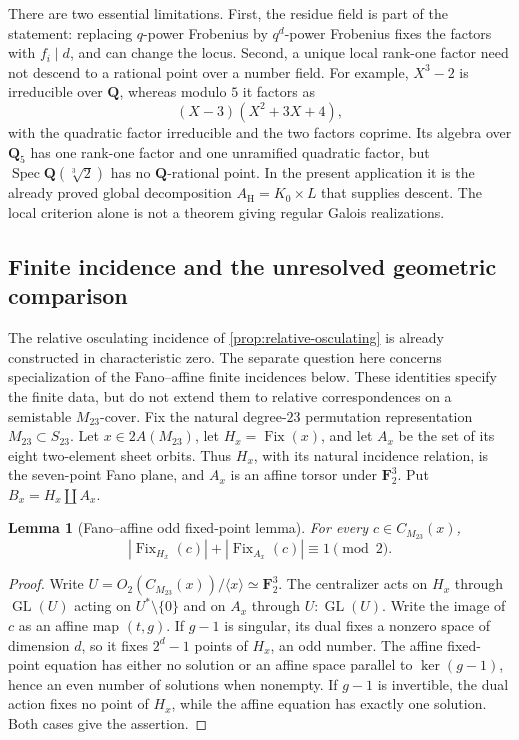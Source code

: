 \documentclass[11pt]{amsart}
\newtheorem{lemma}[lemma]{Lemma}
\theoremstyle{definition}
\theoremstyle{remark}
\newcommand{\QQ}{\mathbf Q}
\newcommand{\FF}{\mathbf F}
\newcommand{\Fix}{\operatorname{Fix}}
\newcommand{\M}{M_{23}}
\newcommand{\Cx}{C_{M_{23}}(x)}
\begin{document}
There are two essential limitations.  First, the residue field is part of
the statement: replacing $q$-power Frobenius by $q^d$-power Frobenius fixes
the factors with $f_i\mid d$, and can change the locus.  Second, a unique
local rank-one factor need not descend to a rational point over a number
field.  For example, $X^3-2$ is irreducible over $\QQ$, whereas modulo $5$
it factors as
\[
 (X-3)(X^2+3X+4),
\]
with the quadratic factor irreducible and the two factors coprime.
Its algebra over $\QQ_5$ has one rank-one factor and one unramified
quadratic factor, but $\operatorname{Spec}\QQ(\sqrt[3]{2})$ has no
$\QQ$-rational point.  In the present application it is the already proved
global decomposition $A_{\mathrm H}=K_0\times L$ that supplies descent.
The local criterion alone is not a theorem giving regular Galois
realizations.

\subsection{Finite incidence and the unresolved geometric comparison}
\label{sec:connector}

The relative osculating incidence of \cref{prop:relative-osculating}
is already constructed in characteristic zero.
The separate question here concerns specialization of the
Fano--affine finite incidences below.
These identities specify the finite data, but do not extend them
to relative correspondences on a semistable $M_{23}$-cover.
Fix the natural degree-$23$ permutation representation
$M_{23}\subset S_{23}$.  Let $x\in2A(\M)$, let $H_x=\Fix(x)$, and let $A_x$
be the set of its eight two-element sheet orbits.  Thus $H_x$, with its
natural incidence relation, is the seven-point Fano plane, and $A_x$ is an
affine torsor under $\FF_2^3$.  Put
$B_x=H_x\amalg A_x$.

\begin{lemma}[Fano--affine odd fixed-point lemma]
\label{lem:fano-affine-odd}
For every $c\in\Cx$,
\[
 |\Fix_{H_x}(c)|+|\Fix_{A_x}(c)|\equiv1\pmod2.
\]
\end{lemma}

\begin{proof}
Write $U=O_2(\Cx)/\langle x\rangle\simeq\FF_2^3$.  The centralizer acts on
$H_x$ through $\operatorname{GL}(U)$ acting on $U^*\setminus\{0\}$ and on
$A_x$ through $U{:}\operatorname{GL}(U)$.  Write the image of $c$ as an
affine map $(t,g)$.  If $g-1$ is singular, its dual fixes a nonzero space of
dimension $d$, so it fixes $2^d-1$ points of $H_x$, an odd number.  The
affine fixed-point equation has either no solution or an affine space
parallel to $\ker(g-1)$, hence an even number of solutions when nonempty.
If $g-1$ is invertible, the dual action fixes no point of $H_x$, while the
affine equation has exactly one solution.  Both cases give the assertion.
\end{proof}
\end{document}
